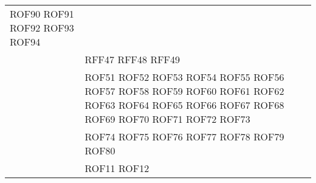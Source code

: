 \documentclass[../DefinizioneDiProdotto_v2.0.0.tex]{subfiles}
\begin{document}
\begin{longtable}{p{8.5cm}!{\VRule[1pt]}p{2.5cm}}
	ROF90 \newline
	ROF91 \newline
	ROF92 \newline
	ROF93 \newline
	ROF94 \\
	                                             & RFF47 \newline
	RFF48 \newline
	RFF49 \\
	                                         & ROF51 \newline
	ROF52 \newline
	ROF53 \newline
	ROF54 \newline
	ROF55 \newline
	ROF56 \newline
	ROF57 \newline
	ROF58 \newline
	ROF59 \newline
	ROF60 \newline
	ROF61 \newline
	ROF62 \newline
	ROF63 \newline
	ROF64 \newline
	ROF65 \newline
	ROF66 \newline
	ROF67 \newline
	ROF68 \newline
	ROF69 \newline
	ROF70 \newline
	ROF71 \newline
	ROF72 \newline
	ROF73 \\
	                                            & ROF74 \newline
	ROF75 \newline
	ROF76 \newline
	ROF77 \newline
	ROF78 \newline
	ROF79 \newline
	ROF80 \\
	                                         & ROF11 \newline
	ROF12 \newline

\end{longtable}
\end{document}

